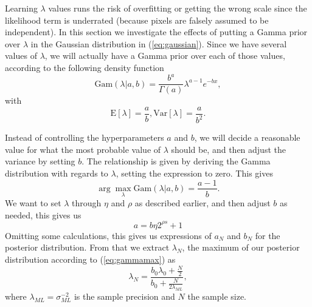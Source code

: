 \documentclass{article}
\begin{document}

Learning $\lambda$ values runs the risk of overfitting or getting the wrong scale since the likelihood term is underrated (because pixels are falsely assumed to be independent). In this section we investigate the effects of putting a Gamma prior over $\lambda$ in the Gaussian distribution in (\ref{eq:gaussian}). Since we have several values of $\lambda$, we will actually have a Gamma prior over each of those values, according to the following density function
\[
    \text{Gam}(\lambda|a,b) = \frac{b^{a}}{\Gamma(a)}\lambda^{a-1}e^{-b x},
\]
with
\[
    \text{E}[\lambda] = \frac{a}{b}, \text{Var}[\lambda] = \frac{a}{b^2}.
\]

Instead of controlling the hyperparameters $a$ and $b$, we will decide a reasonable value for what the most probable value of $\lambda$ should be, and then adjust the variance by setting $b$. The relationship is given by deriving the Gamma distribution with regards to $\lambda$, setting the expression to zero. This gives
\begin{equation} \label{eq:gammamax}
    \arg\max_{\lambda} \text{Gam}(\lambda|a, b) = \frac{a-1}{b}.
\end{equation}
We want to set $\lambda$ through $\eta$ and $\rho$ as described earlier, and then adjust $b$ as needed, this gives us
\[
    a = b \eta 2^{\rho s} + 1
\]
Omitting some calculations, this gives us expressions of $a_N$ and $b_N$ for the posterior distribution. From that we extract $\lambda_N$, the maximum of our posterior distribution according to (\ref{eq:gammamax}) as
\[
    \lambda_N = \frac{b_0 \lambda_0 + \frac{N}{2}}{b_0 + \frac{N}{2 \lambda_{ML}}},
\]
where $\lambda_{ML} = \sigma_{ML}^{-2}$ is the sample precision and $N$ the sample size.

\newcommand{\FT}{F$_\rightarrow $T}
\newcommand{\TF}{T$_\rightarrow $F}
\end{document}

